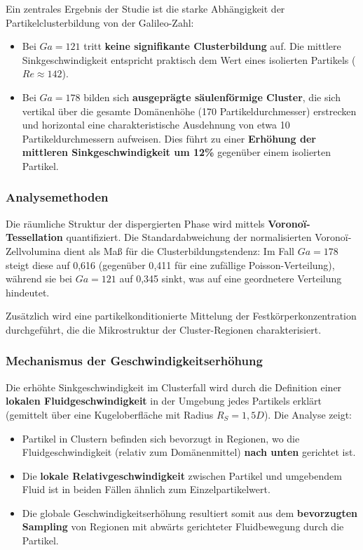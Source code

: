 \documentclass[a4paper,12pt]{article}
\begin{document}
Ein zentrales Ergebnis der Studie ist die starke Abhängigkeit der Partikelclusterbildung von der Galileo-Zahl:

\begin{itemize}
    \item Bei $Ga = 121$ tritt \textbf{keine signifikante Clusterbildung} auf. Die mittlere Sinkgeschwindigkeit entspricht praktisch dem Wert eines isolierten Partikels ($Re \approx 142$).
    
    \item Bei $Ga = 178$ bilden sich \textbf{ausgeprägte säulenförmige Cluster}, die sich vertikal über die gesamte Domänenhöhe (170 Partikeldurchmesser) erstrecken und horizontal eine charakteristische Ausdehnung von etwa 10 Partikeldurchmessern aufweisen. Dies führt zu einer \textbf{Erhöhung der mittleren Sinkgeschwindigkeit um 12\%} gegenüber einem isolierten Partikel.
\end{itemize}

\subsubsection*{Analysemethoden}

Die räumliche Struktur der dispergierten Phase wird mittels \textbf{Voronoï-Tessellation} quantifiziert. Die Standardabweichung der normalisierten Voronoï-Zellvolumina dient als Maß für die Clusterbildungstendenz: Im Fall $Ga = 178$ steigt diese auf 0{,}616 (gegenüber 0{,}411 für eine zufällige Poisson-Verteilung), während sie bei $Ga = 121$ auf 0{,}345 sinkt, was auf eine geordnetere Verteilung hindeutet.

Zusätzlich wird eine partikelkonditionierte Mittelung der Festkörperkonzentration durchgeführt, die die Mikrostruktur der Cluster-Regionen charakterisiert.

\subsubsection*{Mechanismus der Geschwindigkeitserhöhung}

Die erhöhte Sinkgeschwindigkeit im Clusterfall wird durch die Definition einer \textbf{lokalen Fluidgeschwindigkeit} in der Umgebung jedes Partikels erklärt (gemittelt über eine Kugeloberfläche mit Radius $R_S = 1{,}5D$). Die Analyse zeigt:

\begin{itemize}
    \item Partikel in Clustern befinden sich bevorzugt in Regionen, wo die Fluidgeschwindigkeit (relativ zum Domänenmittel) \textbf{nach unten} gerichtet ist.
    \item Die \textbf{lokale Relativgeschwindigkeit} zwischen Partikel und umgebendem Fluid ist in beiden Fällen ähnlich zum Einzelpartikelwert.
    \item Die globale Geschwindigkeitserhöhung resultiert somit aus dem \textbf{bevorzugten Sampling} von Regionen mit abwärts gerichteter Fluidbewegung durch die Partikel.
\end{itemize}
\end{document}
